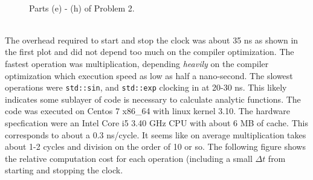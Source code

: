 \documentclass[singlepage,notitlepage,nofootinbib,11pt]{revtex4-1}
\begin{document}
\begin{figure}[h]
\ContinuedFloat
\centering
  \\
\caption{Parts (e) - (h) of Problem 2.}
\end{figure}\\
\indent The overhead required to start and stop the clock was about 35 ns as shown in the first plot and did not depend too much on the compiler optimization. The fastest operation was multiplication, depending {\it heavily} on the compiler optimization which execution speed as low as half a nano-second. The slowest operations were \verb|std::sin|, and \verb|std::exp| clocking in at 20-30 ns. This likely indicates some sublayer of code is necessary to calculate analytic functions. The code was executed on Centos 7 x86\_64 with linux kernel 3.10. The hardware specfication were an Intel Core i5  3.40 GHz CPU with about 6 MB of cache. This corresponds to about a 0.3 ns/cycle. It seems like on average multiplication takes about 1-2 cycles and division on the order of 10 or so. The following figure shows the relative computation cost for each operation (including a small $\Delta t$ from starting and stopping the clock.
\end{document}

